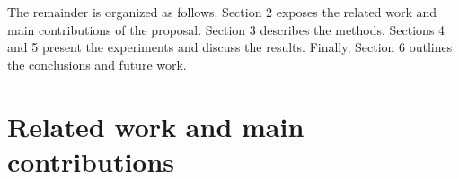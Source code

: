 \documentclass[journal]{IEEEtran}
\begin{document}
The remainder is organized as follows. Section 2 exposes the related
work and main contributions of the proposal. Section 3 describes the
methods. Sections 4 and 5 present the experiments and discuss the
results. Finally, Section 6 outlines the conclusions and future work.

\section{Related work and main contributions}


\end{document}
